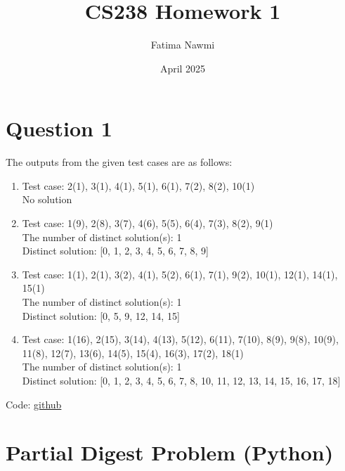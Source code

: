 \documentclass{article}
\title{CS238 Homework 1}
\author{Fatima Nawmi}
\date{April 2025}
\begin{document}
\maketitle

\section{Question 1}

The outputs from the given test cases are as follows:
\begin{enumerate}
    \item Test case: {2(1), 3(1), 4(1), 5(1), 6(1), 7(2), 8(2), 10(1)}\\
No solution\\
    \item Test case: {1(9), 2(8), 3(7), 4(6), 5(5), 6(4), 7(3), 8(2), 9(1)}\\
The number of distinct solution(s): 1\\
Distinct solution: [0, 1, 2, 3, 4, 5, 6, 7, 8, 9]\\

    \item Test case: {1(1), 2(1), 3(2), 4(1), 5(2), 6(1), 7(1), 9(2), 10(1), 12(1), 14(1), 15(1)}\\
    The number of distinct solution(s): 1\\
    Distinct solution: [0, 5, 9, 12, 14, 15]\\
    \item Test case: {1(16), 2(15), 3(14), 4(13), 5(12), 6(11), 7(10), 8(9), 9(8), 10(9), 11(8), 12(7), 13(6), 14(5), 15(4), 16(3), 17(2), 18(1)}\\
    The number of distinct solution(s): 1\\
    Distinct solution: [0, 1, 2, 3, 4, 5, 6, 7, 8, 10, 11, 12, 13, 14, 15, 16, 17, 18]\\
\end{enumerate}

Code: \href{https://github.com/fatimanawmi/CS238/blob/main/PDP.py}{github}

\section*{Partial Digest Problem (Python)}
\end{document}
